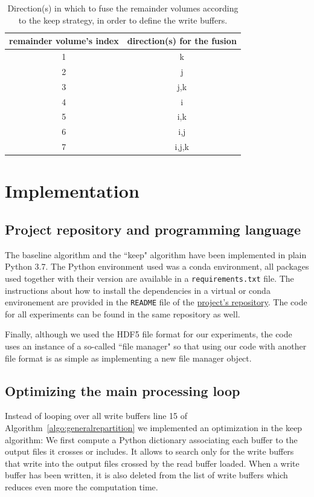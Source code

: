 \documentclass[sigconf, nonacm]{acmart}
\begin{document}
{\begin{table}[ht]
  \centering
  \caption{Direction(s) in which to fuse the remainder volumes according to the keep strategy, in order to define the write buffers.}

   \begin{tabular}[t]{ | c | c | }
   \hline
   remainder volume's index & direction(s) for the fusion \\
     \hline\hline
     1 & k \\
     \hline
     2 & j \\
     \hline
     3 & j,k \\
     \hline
     4 & i \\
     \hline
     5 & i,k \\
     \hline
     6 & i,j \\
     \hline
     7 & i,j,k \\
     \hline
   \end{tabular}

   \label{tab:fusion}

\end{table}

\section{Implementation}

\subsection{Project repository and programming language}
The baseline algorithm and the ``keep" algorithm have been implemented in plain
Python 3.7.
The Python environment used was a conda environment, all packages used together
with their version are available in a \texttt{requirements.txt} file.
The instructions about how to install the dependencies in a virtual or conda
environement are provided in the \texttt{README} file of the
\href{https://github.com/GTimothee/repartition_experiments}{project's repository}.
The code for all experiments can be found in the same repository as well.

Finally, although we used the HDF5 file format for our experiments, the code
uses an instance of a so-called ``file manager" so that using our code with
another file format is as simple as implementing a new file manager object.

\subsection{Optimizing the main processing loop}
Instead of looping over all write buffers line 15 of
Algorithm~\ref{algo:generalrepartition} we implemented an optimization in
the keep algorithm:
We first compute a Python dictionary associating each buffer to the output files
it crosses or includes.
It allows to search only for the write buffers that write into the output files
crossed by the read buffer loaded. When a write buffer has been written, it
is also deleted from the list of write buffers which reduces even more the
computation time.

}
\end{document}
